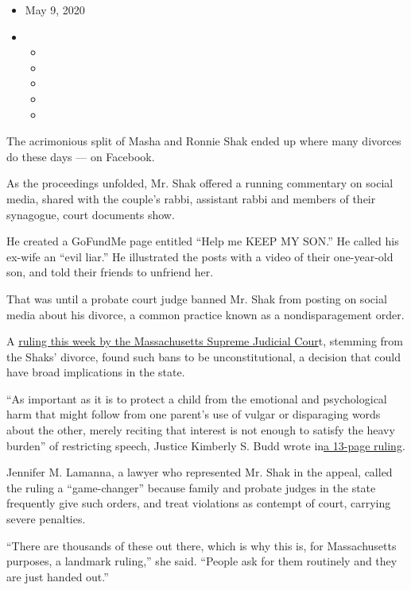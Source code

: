 \begin{itemize}
\item
  May 9, 2020
\item
  \begin{itemize}
  \item
  \item
  \item
  \item
  \item
  \end{itemize}
\end{itemize}

The acrimonious split of Masha and Ronnie Shak ended up where many
divorces do these days --- on Facebook.

As the proceedings unfolded, Mr. Shak offered a running commentary on
social media, shared with the couple's rabbi, assistant rabbi and
members of their synagogue, court documents show.

He created a GoFundMe page entitled ``Help me KEEP MY SON.'' He called
his ex-wife an ``evil liar.'' He illustrated the posts with a video of
their one-year-old son, and told their friends to unfriend her.

That was until a probate court judge banned Mr. Shak from posting on
social media about his divorce, a common practice known as a
nondisparagement order.

A
\href{https://www.courtlistener.com/pdf/2020/05/07/shak_v._shak.pdf}{ruling
this week by the Massachusetts Supreme Judicial Cour}t, stemming from
the Shaks' divorce, found such bans to be unconstitutional, a decision
that could have broad implications in the state.

``As important as it is to protect a child from the emotional and
psychological harm that might follow from one parent's use of vulgar or
disparaging words about the other, merely reciting that interest is not
enough to satisfy the heavy burden'' of restricting speech, Justice
Kimberly S. Budd wrote
in\href{https://www.courtlistener.com/pdf/2020/05/07/shak_v._shak.pdf}{a
13-page ruling}.

Jennifer M. Lamanna, a lawyer who represented Mr. Shak in the appeal,
called the ruling a ``game-changer'' because family and probate judges
in the state frequently give such orders, and treat violations as
contempt of court, carrying severe penalties.

``There are thousands of these out there, which is why this is, for
Massachusetts purposes, a landmark ruling,'' she said. ``People ask for
them routinely and they are just handed out.''

